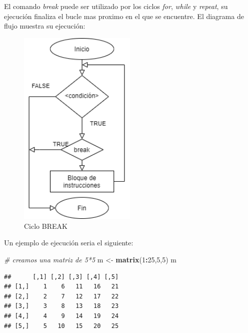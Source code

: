\documentclass[11pt,]{article}
\newenvironment{Shaded}{\begin{snugshade}}{\end{snugshade}}
\newcommand{\CommentTok}[1]{\textcolor[rgb]{0.56,0.35,0.01}{\textit{#1}}}
\newcommand{\DecValTok}[1]{\textcolor[rgb]{0.00,0.00,0.81}{#1}}
\newcommand{\KeywordTok}[1]{\textcolor[rgb]{0.13,0.29,0.53}{\textbf{#1}}}
\newcommand{\NormalTok}[1]{#1}
\newcommand{\OperatorTok}[1]{\textcolor[rgb]{0.81,0.36,0.00}{\textbf{#1}}}
\newcommand{\StringTok}[1]{\textcolor[rgb]{0.31,0.60,0.02}{#1}}
\begin{document}
El comando \emph{break} puede ser utilizado por los ciclos \emph{for},
\emph{while} y \emph{repeat}, su ejecución finaliza el bucle mas proximo
en el que se encuentre. El diagrama de flujo muestra su ejecución:

\begin{figure}
\hypertarget{id}{%
\centering
\includegraphics[width=0.5\textwidth,height=0.3\textheight]{../schemas/BREAK.png}
\caption{Ciclo BREAK}\label{id}
}
\end{figure}

Un ejemplo de ejecución seria el siguiente:

\begin{Shaded}
\begin{Highlighting}[]
\CommentTok{# creamos una matriz de 5*5}
\NormalTok{m <-}\StringTok{  }\KeywordTok{matrix}\NormalTok{(}\DecValTok{1}\OperatorTok{:}\DecValTok{25}\NormalTok{,}\DecValTok{5}\NormalTok{,}\DecValTok{5}\NormalTok{)}
\NormalTok{m}
\end{Highlighting}
\end{Shaded}

\begin{verbatim}
##      [,1] [,2] [,3] [,4] [,5]
## [1,]    1    6   11   16   21
## [2,]    2    7   12   17   22
## [3,]    3    8   13   18   23
## [4,]    4    9   14   19   24
## [5,]    5   10   15   20   25
\end{verbatim}
\end{document}
